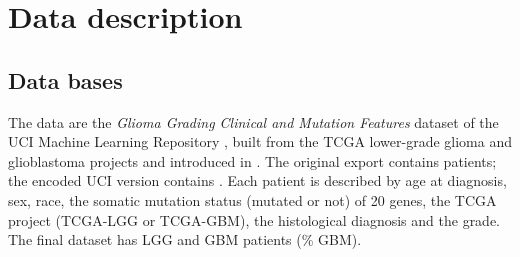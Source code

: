 \section{Data description}

\subsection{Data bases}

The data are the \emph{Glioma Grading Clinical and Mutation Features} dataset of the UCI Machine
Learning Repository \cite{tasci2022dataset}, built from the TCGA lower-grade glioma and
glioblastoma projects \cite{tcga2015lgg,brennan2013} and introduced in \cite{tasci2022}. The original
export contains \NRaw{} patients; the encoded UCI version contains \NClean{}. Each patient is
described by age at diagnosis, sex, race, the somatic mutation status (mutated or not) of 20 genes,
the TCGA project (TCGA-LGG or TCGA-GBM), the histological diagnosis and the grade. The final dataset
has \NLGG{} LGG and \NGBM{} GBM patients (\PctGBM\% GBM).

